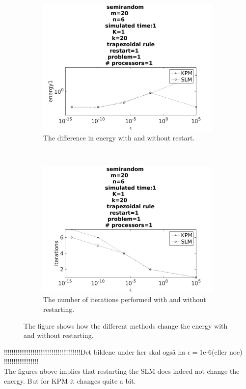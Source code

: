 \begin{figure}[H]
        \centering
        \begin{subfigure}[b]{0.45\textwidth}
                \includegraphics[width=\textwidth]{../MATLAB/fig/compareEnergy.jpg}
                \caption{ The difference in energy with and without restart. }
                \label{fig:compareEnergy}
        \end{subfigure}
        ~
        \begin{subfigure}[b]{0.45\textwidth}
                \includegraphics[width=\textwidth]{../MATLAB/fig/compareIter.jpg}
                \caption{ The number of iterations performed with and without restarting.  }
                \label{fig:compareIter}
        \end{subfigure}
        \caption{ The figure shows how the different methods change the energy with and without restarting.  }
        \label{fig:compare}
\end{figure}
!!!!!!!!!!!!!!!!!!!!!!!!!!!!!!!!!!!!!!!!Det bildene under her skal også ha $\epsilon =$1e-6(eller noe) !!!!!!!!!!!!!!!!!!\\
The figures above implies that restarting the SLM does indeed not change the energy. But for KPM it changes quite a bit. 

